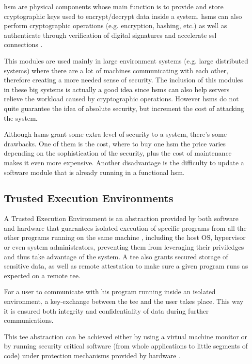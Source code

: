 \gls{hsm} \cite{hsmPaper} are physical components whose main function is to provide and store cryptographic keys used to encrypt/decrypt data inside a system. \gls{hsm}s can also perform cryptographic operations (e.g. encryption, hashing, etc.) as well as authenticate through verification of digital signatures and accelerate \gls{ssl} connections \cite{hsmThesis}.

This modules are used mainly in large environment systems (e.g. large distributed systems) where there are a lot of machines communicating with each other, therefore creating a more needed sense of security. The inclusion of this modules in these big systems is actually a good idea since \gls{hsm}s can also help servers relieve the workload caused by cryptographic operations. However \gls{hsm}s do not quite guarantee the idea of absolute security, but increment the cost of attacking the system.

Although \gls{hsm}s grant some extra level of security to a system, there's some drawbacks. One of them is the cost, where to buy one \gls{hsm} the price varies depending on the sophistication of the security, plus the cost of maintenance makes it even more expensive. Another disadvantage is the difficulty to update a software module that is already running in a functional \gls{hsm}.

\subsection{Trusted Execution Environments}
\label{ssec:tee}

A Trusted Execution Environment is an abstraction provided by both software and hardware that guarantees isolated execution of specific programs from all the other programs running on the same machine \cite{guiBorgesThesis}, including the host OS, hypervisor or even system administrators, preventing them from leveraging their priviledges and thus take advantage of the system. A \gls{tee} also grants secured storage of sensitive data, as well as remote attestation to make sure a given program runs as expected on a remote \gls{tee}. 

For a user to communicate with his program running inside an isolated environment, a key-exchange between the \gls{tee} and the user takes place. This way it is ensured both integrity and confidentiality of data during further communications.

This \gls{tee} abstraction can be achieved either by using a virtual machine monitor or by running security critical software (from whole applications to little segments of code) under protection mechanisms provided by hardware \cite{pcopThesis}. 

